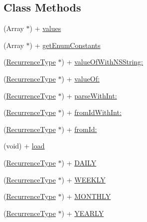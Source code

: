 \subsection*{Class Methods}
\begin{DoxyCompactItemize}
\item 
(Array $\ast$) + \hyperlink{interface_recurrence_type_a0ee361eca0dd50f596513bf269840f14}{values}
\item 
(Array $\ast$) + \hyperlink{interface_recurrence_type_ad6babf61919bd7f9735e060a3b50f78b}{get\+Enum\+Constants}
\item 
(\hyperlink{interface_recurrence_type}{Recurrence\+Type} $\ast$) + \hyperlink{interface_recurrence_type_a6e769b9e46e801722aa54aeba34a69cb}{value\+Of\+With\+N\+S\+String\+:}
\item 
(\hyperlink{interface_recurrence_type}{Recurrence\+Type} $\ast$) + \hyperlink{interface_recurrence_type_ad0d39feb275a84f853799ce544978eac}{value\+Of\+:}
\item 
(\hyperlink{interface_recurrence_type}{Recurrence\+Type} $\ast$) + \hyperlink{interface_recurrence_type_a89a051c6be240e53e7eaeebdc1c33a70}{parse\+With\+Int\+:}
\item 
(\hyperlink{interface_recurrence_type}{Recurrence\+Type} $\ast$) + \hyperlink{interface_recurrence_type_aa7a76003fa1046413d4885b3644fe153}{from\+Id\+With\+Int\+:}
\item 
(\hyperlink{interface_recurrence_type}{Recurrence\+Type} $\ast$) + \hyperlink{interface_recurrence_type_a27dcdb744047c265c575783662a13f11}{from\+Id\+:}
\item 
(void) + \hyperlink{interface_recurrence_type_a89bbeea8723d68752fd906fd7ea1045f}{load}
\item 
(\hyperlink{interface_recurrence_type}{Recurrence\+Type} $\ast$) + \hyperlink{interface_recurrence_type_ad496851ec510b211f6b1fad664bddedc}{D\+A\+I\+L\+Y}
\item 
(\hyperlink{interface_recurrence_type}{Recurrence\+Type} $\ast$) + \hyperlink{interface_recurrence_type_ad2fc3bd8c59c02213f831af615cfc37f}{W\+E\+E\+K\+L\+Y}
\item 
(\hyperlink{interface_recurrence_type}{Recurrence\+Type} $\ast$) + \hyperlink{interface_recurrence_type_a0a332b2accf511da794e75a52dadf4c2}{M\+O\+N\+T\+H\+L\+Y}
\item 
(\hyperlink{interface_recurrence_type}{Recurrence\+Type} $\ast$) + \hyperlink{interface_recurrence_type_a8c34a59e25d6db69207afa719a0075aa}{Y\+E\+A\+R\+L\+Y}
\end{DoxyCompactItemize}


